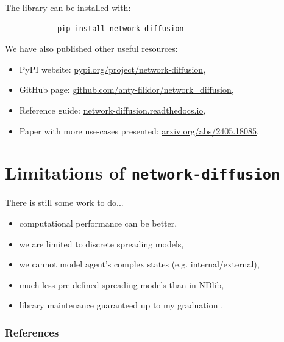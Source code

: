 \documentclass{beamer}
\begin{document}
\begin{frame}[fragile]{\secname}
    The library can be installed with:
    \begin{center}
        \large
        \begin{verbatim}
            pip install network-diffusion
        \end{verbatim}
    \end{center}
    We have also published other useful resources:
    \begin{itemize}
        \item PyPI website: \url{pypi.org/project/network-diffusion},
        \item GitHub page: \url{github.com/anty-filidor/network_diffusion},
        \item Reference guide: \url{network-diffusion.readthedocs.io},
        \item Paper with more use-cases presented: \url{arxiv.org/abs/2405.18085}.
    \end{itemize}
\end{frame}

\section{Limitations of \lstinline[style=py]{network-diffusion}}

\begin{frame}{\secname}
    There is still some work to do...
    \vspace{1em}
    \begin{itemize}
        \item computational performance can be better,
        \item we are limited to discrete spreading models,
        \item we cannot model agent's complex states (e.g. internal/external),
        \item much less pre-defined spreading models than in NDlib,
        \item library maintenance guaranteed up to my graduation \Winkey.
    \end{itemize}
\end{frame}

\begin{frame}[allowframebreaks]
    \frametitle{References}
    \printbibliography
\end{frame}

\addtocounter{framenumber}{1}
\end{document}
